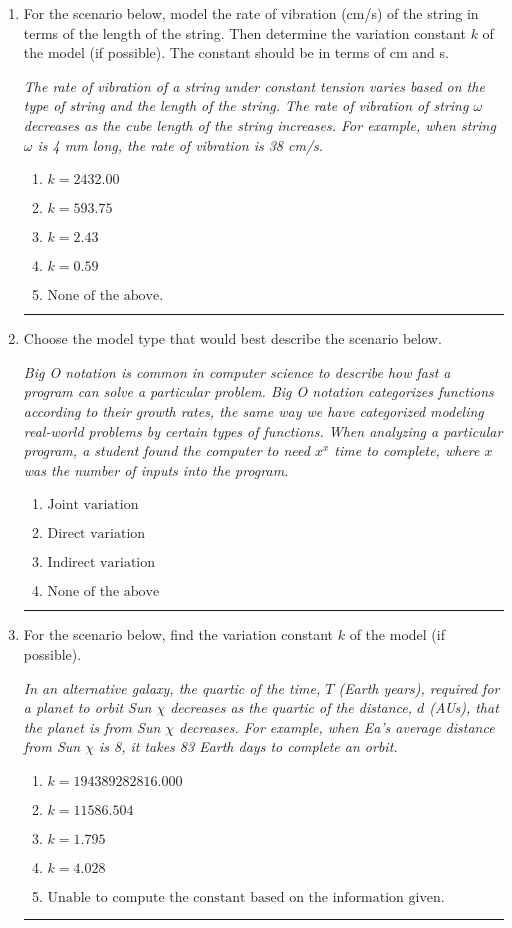 \documentclass[14pt]{extbook}
\newcommand{\litem}[1]{\item#1\hspace*{-1cm}\rule{\textwidth}{0.4pt}}
\begin{document}
\begin{enumerate}
\litem{
For the scenario below, model the rate of vibration (cm/s) of the string in terms of the length of the string. Then determine the variation constant $k$ of the model (if possible). The constant should be in terms of cm and s.
\begin{center}
    \textit{ The rate of vibration of a string under constant tension varies based on the type of string and the length of the string. The rate of vibration of string $\omega$ decreases as the cube length of the string increases. For example, when string $\omega$ is 4 mm long, the rate of vibration is 38 cm/s. }
\end{center}
\begin{enumerate}[label=\Alph*.]
\item \( k = 2432.00 \)
\item \( k = 593.75 \)
\item \( k = 2.43 \)
\item \( k = 0.59 \)
\item \( \text{None of the above.} \)

\end{enumerate} }
\litem{
Choose the model type that would best describe the scenario below.
\begin{center}
    \textit{ Big O notation is common in computer science to describe how fast a program can solve a particular problem. Big O notation categorizes functions according to their growth rates, the same way we have categorized modeling real-world problems by certain types of functions. When analyzing a particular program, a student found the computer to need $x^x$ time to complete, where $x$ was the number of inputs into the program. }
\end{center}
\begin{enumerate}[label=\Alph*.]
\item \( \text{Joint variation} \)
\item \( \text{Direct variation} \)
\item \( \text{Indirect variation} \)
\item \( \text{None of the above} \)

\end{enumerate} }
\litem{
For the scenario below, find the variation constant $k$ of the model (if possible).
\begin{center}
    \textit{ In an alternative galaxy, the quartic of the time, $T$ (Earth years), required for a planet to orbit Sun $\chi$ decreases as the quartic of the distance, $d$ (AUs), that the planet is from Sun $\chi$ decreases. For example, when Ea's average distance from Sun $\chi$ is 8, it takes 83 Earth days to complete an orbit. }
\end{center}
\begin{enumerate}[label=\Alph*.]
\item \( k = 194389282816.000 \)
\item \( k = 11586.504 \)
\item \( k = 1.795 \)
\item \( k = 4.028 \)
\item \( \text{Unable to compute the constant based on the information given.} \)


\end{enumerate}}
\end{enumerate}
\end{document}
